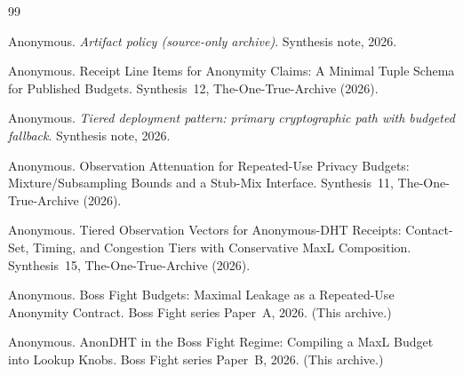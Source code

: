 \documentclass[11pt]{article}
\begin{document}
\begin{thebibliography}{99}\small

Anonymous.
\newblock \emph{Artifact policy (source-only archive)}.
\newblock Synthesis note, 2026.

Anonymous.
\newblock Receipt Line Items for Anonymity Claims: A Minimal Tuple Schema for Published Budgets.
\newblock Synthesis~12, The-One-True-Archive (2026).

Anonymous.
\newblock \emph{Tiered deployment pattern: primary cryptographic path with budgeted fallback}.
\newblock Synthesis note, 2026.

Anonymous.
\newblock Observation Attenuation for Repeated-Use Privacy Budgets: Mixture/Subsampling Bounds and a Stub-Mix Interface.
\newblock Synthesis~11, The-One-True-Archive (2026).


Anonymous.
\newblock Tiered Observation Vectors for Anonymous-DHT Receipts: Contact-Set, Timing, and Congestion Tiers with Conservative MaxL Composition.
\newblock Synthesis~15, The-One-True-Archive (2026).

Anonymous.
\newblock Boss Fight Budgets: Maximal Leakage as a Repeated-Use Anonymity Contract.
\newblock Boss Fight series Paper~A, 2026. (This archive.)


Anonymous.
\newblock AnonDHT in the Boss Fight Regime: Compiling a MaxL Budget into Lookup Knobs.
\newblock Boss Fight series Paper~B, 2026. (This archive.)


\end{thebibliography}
\end{document}
